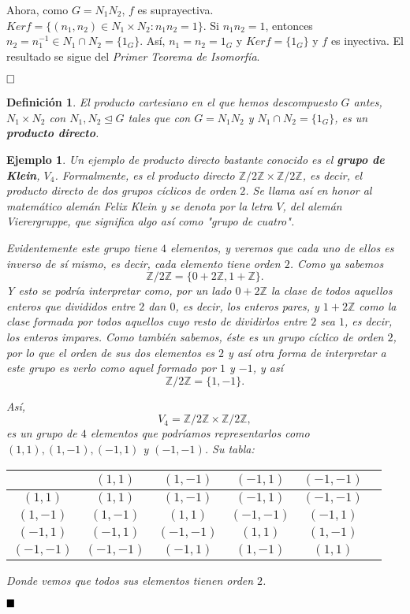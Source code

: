 \documentclass[12pt]{article}
\newtheorem{definition}[theorem]{Definición}
\newtheorem{example}{Ejemplo}[theorem]
\begin{document}
Ahora, como $G=N_{1}N_{2}$, $f$ es suprayectiva. $Ker f = \lbrace (n_{1},n_{2}) \in N_{1}\times N_{2}:n_{1}n_{2}=1 \rbrace$. Si $n_{1}n_{2}=1$, entonces $n_{2}=n_{1}^{-1}\in N_{1}\cap N_{2}=\lbrace 1_{G}\rbrace$. Así, $n_{1}=n_{2}=1_{G}$ y $Ker f=\lbrace 1_{G} \rbrace$ y $f$ es inyectiva. El resultado se sigue del \textit{Primer Teorema de Isomorfía}.

$\hfill \square$

\begin{definition}El producto cartesiano en el que hemos descompuesto $G$ antes, $N_{1}\times N_{2}$ con $N_{1}, N_{2}\unlhd G$ tales que con $G=N_{1}N_{2}$ y $N_{1}\cap N_{2}= \lbrace 1_{G} \rbrace$, es un \textbf{producto directo}. 
\end{definition}

\begin{example}Un ejemplo de producto directo bastante conocido es el \textbf{grupo de Klein}, $V_4$. Formalmente, es el producto directo $\mathbb{Z}/2\mathbb{Z} \times \mathbb{Z}/2\mathbb{Z}$, es decir, el producto directo de dos grupos cíclicos de orden $2$. Se llama así en honor al matemático alemán Felix Klein y se denota por la letra $V$, del alemán Vierergruppe, que significa algo así como "grupo de cuatro". 

Evidentemente este grupo tiene $4$ elementos, y veremos que cada uno de ellos es inverso de sí mismo, es decir, cada elemento tiene orden $2$. Como ya sabemos $$\mathbb{Z}/2\mathbb{Z} = \lbrace 0 + 2\mathbb{Z}, 1 + \mathbb{Z} \rbrace.$$ Y esto se podría interpretar como, por un lado $0+2\mathbb{Z}$ la clase de todos aquellos enteros que divididos entre $2$ dan $0$, es decir, los enteros pares, y $1+2\mathbb{Z}$ como la clase formada por todos aquellos cuyo resto de dividirlos entre $2$ sea $1$, es decir, los enteros impares. Como también sabemos, éste es un grupo cíclico de orden $2$, por lo que el orden de sus dos elementos es $2$ y así otra forma de interpretar a este grupo es verlo como aquel formado por $1$ y $-1$, y así $$\mathbb{Z}/2\mathbb{Z} = \lbrace 1, -1 \rbrace.$$

Así, $$V_4 = \mathbb{Z}/2\mathbb{Z} \times \mathbb{Z}/2\mathbb{Z},$$ es un grupo de $4$ elementos que podríamos representarlos como $(1,1), (1,-1), (-1,1)$ y $(-1,-1)$. Su tabla:
\begin{center}
\begin{tabular}{c|c c c c c}
&$(1,1)$&$(1,-1)$&$(-1,1)$&$(-1,-1)$&\\ \hline
$(1,1)$&$(1,1) $&$(1,-1)$&$(-1,1)$&$(-1,-1)$& \\ 
$(1,-1)$&$(1,-1)$&$(1,1)$&$(-1,-1)$&$(-1,1)$& \\ 
$(-1,1)$&$(-1,1)$&$(-1,-1)$&$(1,1)$&$(1,-1)$& \\ 
$(-1,-1)$&$(-1,-1)$&$(-1,1)$&$(1,-1)$&$(1,1)$& \\												\end{tabular}
\end{center}
Donde vemos que todos sus elementos tienen orden $2$.
\end{example}
$\hfill \blacksquare$
\end{document}
